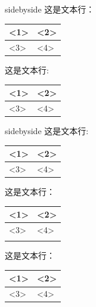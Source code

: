 \documentclass[cn,chinese,color=cyan]{elegantbook}
\begin{document}
\begin{tcblisting}{sidebyside}
这是文本行：
\begin{tabular}[c]{|l|l|} \hline
<1> & <2> \\ \hline
<3> & <4>  \\ \hline
\end{tabular}
\vskip 3mm
这是文本行:
\begin{tabular}[t]{|l|l|} \hline
<1> & <2> \\ \hline
<3> & <4>  \\ \hline
\end{tabular}
\end{tcblisting}
\begin{tcblisting}{sidebyside}
这是文本行:
\begin{tabular}[b]{|l|l|} \hline
<1> & <2> \\ \hline
<3> & <4>  \\ \hline
\end{tabular}
\vskip 3mm
这是文本行：
\begin{tabular}[b]{|l|l|} \hline
<1> & <2>  \\ \hline
<3> & <4> \\ \lasthline
\end{tabular}
\vskip 3mm
这是文本行：
\begin{tabular}[t]{|l|l|} \firsthline
<1> & <2>  \\ \hline
<3> & <4> \\ \hline
\end{tabular}
\end{tcblisting}
\end{document}
